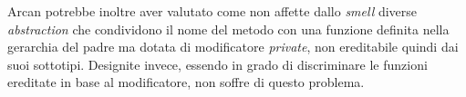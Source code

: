         Arcan potrebbe inoltre aver valutato come non affette dallo \textit{smell} diverse \textit{abstraction} che condividono il nome del metodo con una funzione definita nella gerarchia del padre ma dotata di modificatore \textit{private}, non ereditabile quindi dai suoi sottotipi. Designite invece, essendo in grado di discriminare le funzioni ereditate in base al modificatore, non soffre di questo problema. %
        
